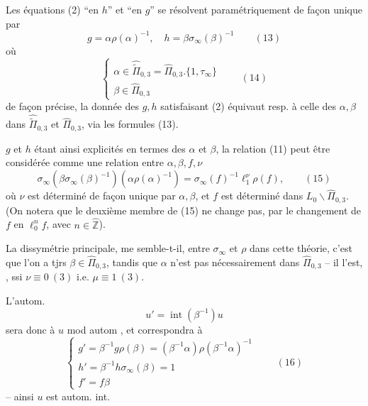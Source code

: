 
Les équations (2) ``en $h$'' et ``en $g$'' se résolvent paramétriquement de façon unique par
\[
g=\alpha\rho(\alpha)^{-1},\quad
h=\beta\sigma_\infty(\beta)^{-1}
\qquad (13)
\]
où
\[
\left\{\begin{array}{l}
\alpha\in\widehat{\widetilde{\Pi}}_{0,3}=\widehat{\Pi}_{0,3}.\{1,\tau_\infty\}\\
\beta\in\widehat{\Pi}_{0,3}
\end{array}\right.
\qquad (14)
\]
de façon précise, la donnée des $g,h$ satisfaisant (2) équivaut resp. à celle des $\alpha,\beta$ dans $\widehat{\widetilde{\Pi}}_{0,3}$ et $\widehat{\Pi}_{0,3}$, via les formules (13).



 $g$ et $h$ étant ainsi explicités en termes des $\alpha$ et $\beta$, la relation  (11) peut être considérée comme une relation entre $\alpha,\beta,f,\nu$
\[
\sigma_\infty(\beta\sigma_\infty(\beta)^{-1})(\alpha\rho(\alpha)^{-1})
=\sigma_\infty(f)^{-1}\ell_1^\nu\rho(f),
\qquad (15)
\]
où  $\nu$ est déterminé de façon unique par $\alpha,\beta$, et $f$ est déterminé dans $L_0\backslash\widehat{\Pi}_{0,3}$.
(On notera que le deuxième membre de (15) ne change pas, par le changement de $f$ en $\ell_0^n f$, avec $n\in\widehat{\mathbb Z}$).

La dissymétrie principale, me semble-t-il, entre $\sigma_\infty$ et $\rho$ dans cette théorie, c'est que  l'on a tjrs $\beta\in\widehat{\Pi}_{0,3}$, tandis que $\alpha$ n'est pas nécessairement dans $\widehat{\Pi}_{0,3}$ -- il l'est, , ssi $\nu\equiv0\ (3)$ i.e. $\mu\equiv1\ (3)$.

L'autom.
\[
u'=\operatorname{int}(\beta^{-1})u
\]
sera donc  à $u$ mod autom , et correspondra à
\[
\left\{\begin{array}{l}
g'=\beta^{-1}g\rho(\beta)=(\beta^{-1}\alpha)\rho(\beta^{-1}\alpha)^{-1}\\
h'=\beta^{-1}h\sigma_\infty(\beta)=1\\
f'=f\beta
\end{array}\right.
\qquad (16)
\]
-- ainsi $u$ est   autom. int.

